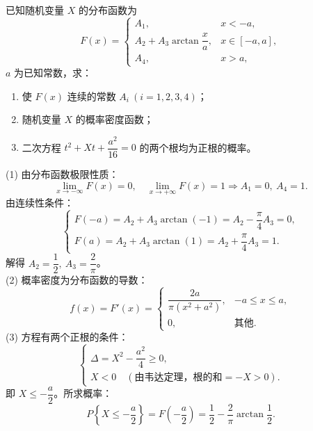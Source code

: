 ﻿\documentclass[lang=cn,11pt]{elegantbook}
\begin{document}
\begin{exercise}[反正切分布函数]
已知随机变量 $X$ 的分布函数为
\[
F(x)=
\begin{cases}
A_1, & x<-a, \\[4pt]
A_2+A_3\arctan\dfrac{x}{a}, & x\in[-a,a], \\[6pt]
A_4, & x>a,
\end{cases}
\]
$a$ 为已知常数，求：
\begin{enumerate}
    \item[(1)] 使 $F(x)$ 连续的常数 $A_i\ (i=1,2,3,4)$；
    \item[(2)] 随机变量 $X$ 的概率密度函数；
    \item[(3)] 二次方程 $t^2+Xt+\dfrac{a^2}{16}=0$ 的两个根均为正根的概率。
\end{enumerate}
\end{exercise}
\begin{solution}
(1) 由分布函数极限性质：
\[
\lim_{x\to-\infty}F(x)=0,\quad \lim_{x\to+\infty}F(x)=1 \Rightarrow A_1=0,\ A_4=1.
\]
由连续性条件：
\[
\begin{cases}
F(-a)=A_2+A_3\arctan(-1)=A_2-\dfrac{\pi}{4}A_3=0, \\[6pt]
F(a)=A_2+A_3\arctan(1)=A_2+\dfrac{\pi}{4}A_3=1.
\end{cases}
\]
解得 $A_2=\dfrac{1}{2},\ A_3=\dfrac{2}{\pi}$。\\
(2) 概率密度为分布函数的导数：
\[
f(x)=F'(x)=
\begin{cases}
\dfrac{2a}{\pi(x^2+a^2)}, & -a\leqslant x\leqslant a, \\[6pt]
0, & \text{其他}.
\end{cases}
\]
(3) 方程有两个正根的条件：
\[
\begin{cases}
\Delta=X^2-\dfrac{a^2}{4}\geqslant0, \\[4pt]
X<0 \quad (\text{由韦达定理，根的和}=-X>0).
\end{cases}
\]
即 $X\leqslant-\dfrac{a}{2}$。所求概率：
\[
P\left\{X\leqslant-\frac{a}{2}\right\}=F\left(-\frac{a}{2}\right)=\frac{1}{2}-\frac{2}{\pi}\arctan\frac{1}{2}.
\]
\end{solution}
\end{document}
